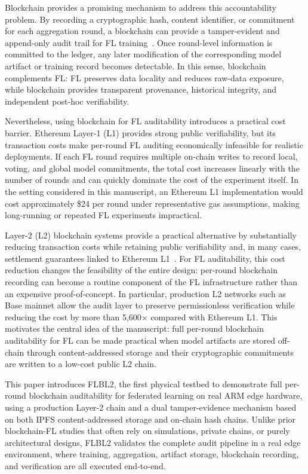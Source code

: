 \documentclass{llncs}
\begin{document}
Blockchain provides a promising mechanism to address this accountability problem. By recording a cryptographic hash, content identifier, or commitment for each aggregation round, a blockchain can provide a tamper-evident and append-only audit trail for FL training~\cite{qu2022blockchain,qammar2023securing}. Once round-level information is committed to the ledger, any later modification of the corresponding model artifact or training record becomes detectable. In this sense, blockchain complements FL: FL preserves data locality and reduces raw-data exposure, while blockchain provides transparent provenance, historical integrity, and independent post-hoc verifiability.

Nevertheless, using blockchain for FL auditability introduces a practical cost barrier. Ethereum Layer-1 (L1) provides strong public verifiability, but its transaction costs make per-round FL auditing economically infeasible for realistic deployments. If each FL round requires multiple on-chain writes to record local, voting, and global model commitments, the total cost increases linearly with the number of rounds and can quickly dominate the cost of the experiment itself. In the setting considered in this manuscript, an Ethereum L1 implementation would cost approximately \$24 per round under representative gas assumptions, making long-running or repeated FL experiments impractical.

Layer-2 (L2) blockchain systems provide a practical alternative by substantially reducing transaction costs while retaining public verifiability and, in many cases, settlement guarantees linked to Ethereum L1~\cite{gudgeon2020sok,zhao2024l2intro}. For FL auditability, this cost reduction changes the feasibility of the entire design: per-round blockchain recording can become a routine component of the FL infrastructure rather than an expensive proof-of-concept. In particular, production L2 networks such as Base mainnet allow the audit layer to preserve permissionless verification while reducing the cost by more than 5,600$\times$ compared with Ethereum L1. This motivates the central idea of the manuscript: full per-round blockchain auditability for FL can be made practical when model artifacts are stored off-chain through content-addressed storage and their cryptographic commitments are written to a low-cost public L2 chain.

This paper introduces FLBL2, the first physical testbed to demonstrate full per-round blockchain auditability for federated learning on real ARM edge hardware, using a production Layer-2 chain and a dual tamper-evidence mechanism based on both IPFS content-addressed storage and on-chain hash chains. Unlike prior blockchain-FL studies that often rely on simulations, private chains, or purely architectural designs, FLBL2 validates the complete audit pipeline in a real edge environment, where training, aggregation, artifact storage, blockchain recording, and verification are all executed end-to-end.
\end{document}
